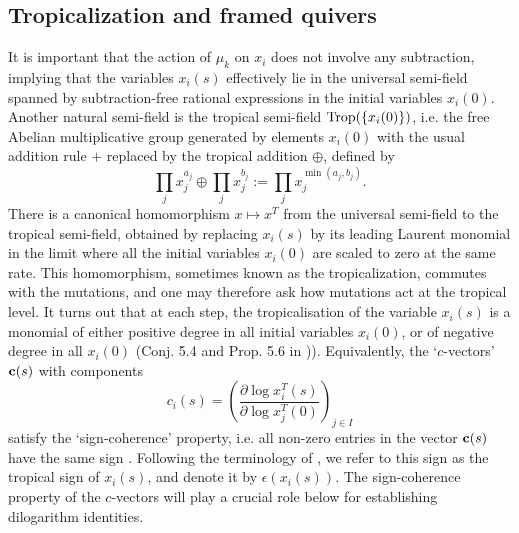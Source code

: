\documentclass[12pt,reqno]{article}
\numberwithin{equation}{section}
\newcommand{\be}{\begin{equation}}
\newcommand{\ee}{\end{equation}}
\def\ind{s}
\numberwithin{equation}{section}
\begin{document}
\subsection{Tropicalization and framed quivers}
\label{trop}
It is important that the action of $\mu_k$ on $x_i$ does not involve any subtraction,
implying that the variables $x_i(\ind)$  effectively lie in the universal semi-field spanned
by subtraction-free rational expressions in the initial variables $x_i(0)$.
Another natural semi-field is the tropical semi-field ${\rm Trop}(\{x_i(0)\})$, i.e. the free Abelian
multiplicative group generated by elements $x_i(0)$ with
the usual addition rule $+$ replaced by the tropical addition $\oplus$, defined by
\be
\label{troplus}
\prod_j x_j^{a_j} \oplus \prod_j x_j^{b_j} := \prod_j x_j^{\min(a_j,b_j)} .
\ee
There is a canonical
homomorphism  $x\mapsto x^T$ from the universal semi-field to the tropical
semi-field, obtained by replacing $x_i(\ind)$ by its leading Laurent monomial in the limit
where all the initial variables $x_i(0)$ are scaled to zero at the same rate.
This homomorphism, sometimes known as the tropicalization, commutes
with the mutations, and one may therefore ask how mutations act at the tropical
level. It turns out that at each step, the tropicalisation of the variable $x_i(\ind)$
is a monomial of either positive degree in all initial variables $x_i(0)$, or of
negative degree in all $x_i(0)$ (Conj. 5.4 and Prop. 5.6 in \cite{MR2295199})).
Equivalently, the `$c$-vectors' ${\bf c}(s)$ with components
\be
c_i(\ind)=\left(\frac{\partial\log x_i^T(\ind)}{\partial \log x^T_j(0)}\right)_{j\in I}
\ee
satisfy the `sign-coherence' property, i.e. all non-zero entries in the vector ${\bf c}(s)$ have
the same sign  \cite{Nakanishi:2011}. Following the terminology of \cite{Kashaev:2011},
we refer to this sign as the tropical sign of $x_i(s)$, and denote it by $\epsilon(x_i(s))$. The sign-coherence
property of the  $c$-vectors will play a crucial role below for establishing dilogarithm identities.
\end{document}
